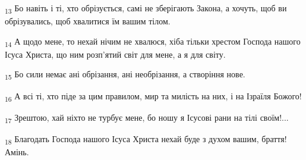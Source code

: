 \begin{tcolorbox}
\textsubscript{13} Бо навіть і ті, хто обрізується, самі не зберігають Закона, а хочуть, щоб ви обрізувались, щоб хвалитися їм вашим тілом.
\end{tcolorbox}
\begin{tcolorbox}
\textsubscript{14} А щодо мене, то нехай нічим не хвалюся, хіба тільки хрестом Господа нашого Ісуса Христа, що ним розп'ятий світ для мене, а я для світу.
\end{tcolorbox}
\begin{tcolorbox}
\textsubscript{15} Бо сили немає ані обрізання, ані необрізання, а створіння нове.
\end{tcolorbox}
\begin{tcolorbox}
\textsubscript{16} А всі ті, хто піде за цим правилом, мир та милість на них, і на Ізраїля Божого!
\end{tcolorbox}
\begin{tcolorbox}
\textsubscript{17} Зрештою, хай ніхто не турбує мене, бо ношу я Ісусові рани на тілі своїм!...
\end{tcolorbox}
\begin{tcolorbox}
\textsubscript{18} Благодать Господа нашого Ісуса Христа нехай буде з духом вашим, браття! Амінь.
\end{tcolorbox}
